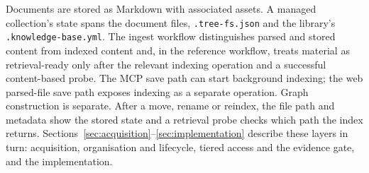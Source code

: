 Documents are stored as Markdown with associated assets. A managed
collection's state spans the document files, \texttt{.tree-fs.json} and the
library's \texttt{.knowledge-base.yml}. The ingest workflow distinguishes
parsed and stored content from indexed content and, in the reference workflow,
treats material as retrieval-ready only after the relevant indexing operation
and a successful content-based probe. The MCP save path can start background
indexing; the web parsed-file save path exposes indexing as a separate
operation. Graph construction is separate. After a move, rename or reindex,
the file path and metadata show the stored state and a retrieval probe checks
which path the index returns. Sections~\ref{sec:acquisition}--\ref{sec:implementation}
describe these layers in turn: acquisition, organisation and lifecycle, tiered
access and the evidence gate, and the implementation.
